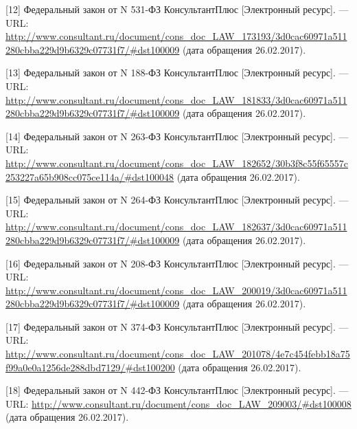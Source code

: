 \documentclass[14pt,a4paper,report]{article}
\begin{document}
[12] Федеральный закон от N 531-ФЗ КонсультантПлюс [Электронный ресурс]. — URL: \href{http://www.consultant.ru/document/cons_doc_LAW_173193/3d0cac60971a511280cbba229d9b6329c07731f7/#dst100009}{http://www.consultant.\linebreak ru/document/cons\_doc\_LAW\_173193/3d0cac60971a511280cbba229d9b6329c07731f7/\#dst100009} (дата обращения 26.02.2017).

[13] Федеральный закон от N 188-ФЗ КонсультантПлюс [Электронный ресурс]. — URL: \href{http://www.consultant.ru/document/cons_doc_LAW_181833/3d0cac60971a511280cbba229d9b6329c07731f7/#dst100009}{http://www.consultant.\linebreak ru/document/cons\_doc\_LAW\_181833/3d0cac60971a511280cbba229d9b6329c07731f7/\#dst100009} (дата обращения 26.02.2017).

[14] Федеральный закон от N 263-ФЗ КонсультантПлюс [Электронный ресурс]. — URL: \href{http://www.consultant.ru/document/cons_doc_LAW_182652/30b3f8c55f65557c253227a65b908cc075ce114a/#dst100048}{http://www.consultant.\linebreak ru/document/cons\_doc\_LAW\_182652/30b3f8c55f65557c253227a65b908cc075ce114a/\#dst100048} (дата обращения 26.02.2017).

[15] Федеральный закон от N 264-ФЗ КонсультантПлюс [Электронный ресурс]. — URL: \href{http://www.consultant.ru/document/cons_doc_LAW_182637/3d0cac60971a511280cbba229d9b6329c07731f7/#dst100009}{http://www.consultant.\linebreak ru/document/cons\_doc\_LAW\_182637/3d0cac60971a511280cbba229d9b6329c07731f7/\#dst100009} (дата обращения 26.02.2017).

[16] Федеральный закон от N 208-ФЗ КонсультантПлюс [Электронный ресурс]. — URL: \href{http://www.consultant.ru/document/cons_doc_LAW_200019/3d0cac60971a511280cbba229d9b6329c07731f7/#dst100009}{http://www.consultant.\linebreak ru/document/cons\_doc\_LAW\_200019/3d0cac60971a511280cbba229d9b6329c07731f7/\#dst100009} (дата обращения 26.02.2017).

[17] Федеральный закон от N 374-ФЗ КонсультантПлюс [Электронный ресурс]. — URL: \href{http://www.consultant.ru/document/cons_doc_LAW_201078/4e7c454febb18a75f99a0e0a1256de288dbd7129/#dst100200}{http://www.consultant.\linebreak ru/document/cons\_doc\_LAW\_201078/4e7c454febb18a75f99a0e0a1256de288dbd7129/\#dst100200} (дата обращения 26.02.2017).

[18] Федеральный закон от N 442-ФЗ КонсультантПлюс [Электронный ресурс]. — URL: \href{http://www.consultant.ru/document/cons_doc_LAW_209003/#dst100008}{http://www.consultant.\linebreak ru/document/cons\_doc\_LAW\_209003/\#dst100008} (дата обращения 26.02.2017).
\end{document}
